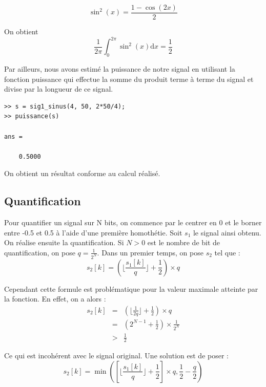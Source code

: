 \documentclass[french]{article}
\begin{document}
\begin{equation}
\sin^2(x)=\frac {1-\cos(2x)} {2}
\end{equation}

On obtient
\begin{equation}
\frac{1} {2 \pi} \int_{0}^{2 \pi} \sin^2(x) \mathrm{d}x = \frac{1}{2}
\end{equation}

Par ailleurs, nous avons estimé la puissance de notre signal en utilisant la fonction puissance qui effectue la somme du produit terme à terme du signal et divise par la longueur de ce signal.

\lstset{language=matlab}
\begin{lstlisting}
>> s = sig1_sinus(4, 50, 2*50/4);
>> puissance(s)

ans =

    0.5000
\end{lstlisting}

On obtient un résultat conforme au calcul réalisé.

\subsection{ Quantification}

Pour quantifier un signal sur N bits, on commence par le centrer en 0 et le borner entre -0.5 et 0.5 à l'aide d'une première homothétie. Soit $s_1$ le signal ainsi obtenu. On réalise ensuite la quantification. Si $N > 0$ est le nombre de bit de quantification, on pose $q=\frac{1}{2^N}$. Dans un premier temps, on pose $s_2$ tel que :
\begin{equation}
  s_2[k] = (\lfloor \frac{s_1[k]}{q} \rfloor + \frac{1}{2}) \times q
\end{equation}

Cependant cette formule est problématique pour la valeur maximale atteinte par la fonction. En effet, on a alors :
\begin{eqnarray}
s_2[k] &=& \left( \lfloor \frac{1}{2q} \rfloor + \frac{1}{2}\right) \times q \\
&=& \left(2^{N-1} + \frac{1}{2}\right) \times \frac{1}{2^N} \\
&>& \frac{1}{2}
\end{eqnarray}

Ce qui est incohérent avec le signal original. Une solution est de poser :
\begin{equation}
  s_2[k] = \min\left(\left[\lfloor \frac{s_1[k]}{q} \rfloor + \frac{1}{2}\right] \times q, \frac{1}{2} - \frac{q}{2}\right)
\end{equation}
\end{document}
